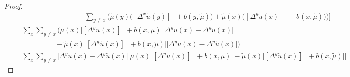\documentclass[10pt,a4paper]{amsart}
\begin{document}
\begin{proof}
\begin{align*}
    &\qquad\qquad\qquad\qquad\quad - \sum_{y\neq x} \Big( \tilde{\mu}(y)\big([\Delta^{x}\tilde{u}(y)]_{-} + b(y,\tilde{\mu})\big)
    + \tilde{\mu}(x)\big([\Delta^{y}\tilde{u}(x)]_{-} + b(x,\tilde{\mu})\big) \Big)
    \Bigg] \\
    &= \sum_{x}\sum_{y\neq x} 
    \Bigg(
    \mu(x) \Big[ [\Delta^{y}u(x)]_{-} + b(x,\mu) \Big] \big[\Delta^{y}u(x)-\Delta^{y}\tilde{u}(x)\big] \\
    &\qquad\qquad\qquad -\tilde{\mu}(x) \Big[ [\Delta^{y}\tilde{u}(x)]_{-} + b(x,\tilde{\mu}) \Big] \big[\Delta^{y}u(x)-\Delta^{y}\tilde{u}(x)\big]
    \Bigg) \\
    &= \sum_{x}\sum_{y\neq x} \big[\Delta^{y}u(x) - \Delta^{y}\tilde{u}(x)\big]
    \Big[
    \mu(x)\big[[\Delta^{y}u(x)]_{-}+b(x,\mu)\big] 
    - \tilde{\mu}(x)\big[[\Delta^{y}\tilde{u}(x)]_{-}+b(x,\tilde{\mu})\big]
    \Big]
\end{align*}


\end{proof}
\end{document}
